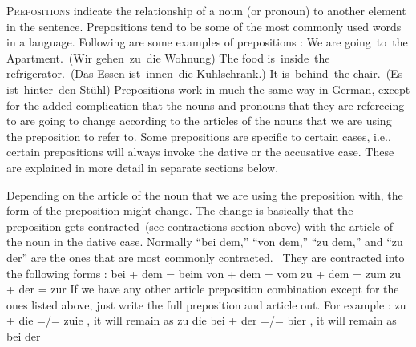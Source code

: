 \documentclass[a4paper,twocolumn,10pt]{article}
\begin{document}
\lettrine[lines=3, findent=3pt, nindent=0pt]{P}{repositions} indicate the
relationship of a noun (or pronoun) to another element in the sentence.
Prepositions tend to be some of the most commonly used words in a language.
Following are some examples of prepositions : We are going to the
Apartment. (Wir gehen zu die Wohnung) The food is inside the refrigerator. (Das
Essen ist innen die Kuhlschrank.) It is behind the chair. (Es ist hinter den
Stühl) Prepositions work in much the same way in German, except for the added
complication that the nouns and pronouns that they are refereeing to are going
to change according to the articles of the nouns that we are using the
preposition to refer to. Some prepositions are specific to certain cases, i.e.,
certain prepositions will always invoke the dative or the accusative case. These
are explained in more detail in separate sections below.


Depending on the article of the noun that we are using the preposition with, the
form of the preposition might change. The change is basically that the
preposition gets contracted (see contractions section above) with the article of
the noun in the dative case.
Normally “bei dem,” “von dem,” “zu dem,” and “zu der” are the ones that are most
commonly contracted.  They are contracted into the following forms :
bei + dem = beim
von + dem = vom
zu + dem = zum
zu + der = zur
If we have any other article preposition combination except for the ones listed
above, just write the full preposition and article out. For example :
zu + die =/= zuie , it will remain as zu die
bei + der =/= bier , it will remain as bei der
\end{document}
